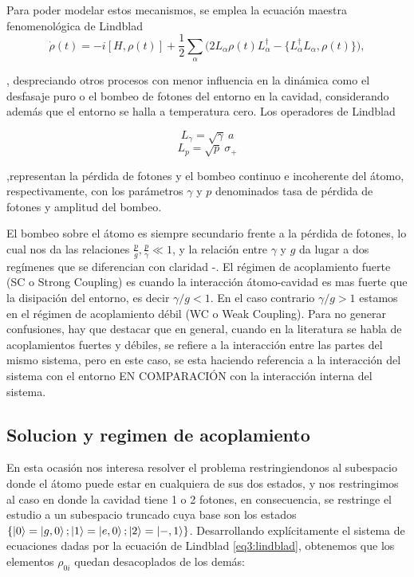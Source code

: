 Para poder modelar estos mecanismos, se emplea la ecuación maestra fenomenológica de Lindblad
\begin{equation}\label{eq3:lindblad}
\dot{\rho}(t) = -i [H, \rho(t)] + \frac{1}{2} \sum_\alpha \big( 2L_\alpha \rho(t) L_\alpha^{\dagger} - \{ L_\alpha^{\dagger}L_\alpha, \rho(t) \} \big),
\end{equation}

, despreciando otros procesos con menor influencia en la dinámica como el desfasaje puro o el bombeo de fotones del entorno en la cavidad, considerando además que el entorno se halla a temperatura cero. Los operadores de Lindblad

\begin{equation}
L_\gamma = \sqrt{\gamma} \ a
\end{equation}
\begin{equation}
L_p = \sqrt{p} \ \sigma_+
\end{equation}

,representan la pérdida de fotones y el bombeo continuo e incoherente del átomo, respectivamente, con los parámetros $\gamma$ y $p$ denominados tasa de pérdida de fotones y amplitud del bombeo. 

El bombeo sobre el átomo es siempre secundario frente a la pérdida de fotones, lo cual nos da las relaciones $\frac{p}{g},\frac{p}{\gamma} \ll 1$, y la relación entre $\gamma$ y $g$ da lugar a dos regímenes que se diferencian con claridad \cite{50}-\cite{54}. El régimen de acoplamiento fuerte (SC o Strong Coupling) es cuando la interacción átomo-cavidad es mas fuerte que la disipación del entorno, es decir $\gamma /g <1$. En el caso contrario $\gamma/g>1$ estamos en el régimen de acoplamiento débil (WC o Weak Coupling). Para no generar confusiones, hay que destacar que en general, cuando en la literatura se habla de acoplamientos fuertes y débiles, se refiere a la interacción entre las partes del mismo sistema, pero en este caso, se esta haciendo referencia a la interacción del sistema con el entorno EN COMPARACIÓN con la interacción interna del sistema.
\subsection{Solucion y regimen de acoplamiento}\label{sec3:regimen acoplamiento}
En esta ocasión nos interesa resolver el problema restringiendonos al subespacio donde el átomo puede estar en cualquiera de sus dos estados, y nos restringimos al caso en donde la cavidad tiene 1 o 2 fotones, en consecuencia, se restringe el estudio a un subespacio truncado cuya base son los estados $\{ \ket{0}=\ket{g,0} ; \ket{1}=\ket{e,0} ; \ket{2}=\ket{-,1} \}$. Desarrollando explícitamente el sistema de ecuaciones dadas por la ecuación de Lindblad \ref{eq3:lindblad}, obtenemos que los elementos $\rho_{0i}$ quedan desacoplados de los demás:

